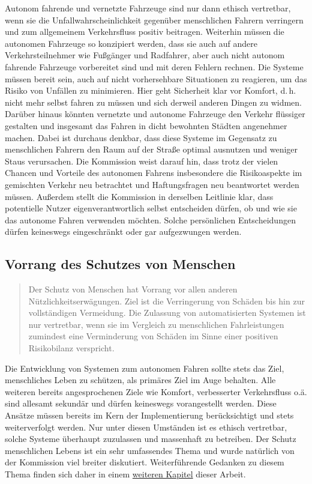 \documentclass[twoside,a4paper,12pt]{article}
\begin{document}
Autonom fahrende und vernetzte Fahrzeuge sind nur dann ethisch vertretbar,
wenn sie die Unfallwahrscheinlichkeit gegenüber menschlichen Fahrern verringern und zum allgemeinem Verkehrsfluss positiv beitragen.
Weiterhin müssen die autonomen Fahrzeuge so konzipiert werden, dass sie auch auf andere Verkehrsteilnehmer wie Fußgänger und 
Radfahrer, aber auch nicht autonom fahrende Fahrzeuge vorbereitet sind und mit deren Fehlern rechnen. Die Systeme müssen bereit 
sein, auch auf nicht vorhersehbare Situationen zu reagieren, um das Risiko von Unfällen zu minimieren. Hier 
geht Sicherheit klar vor Komfort, d.\,h. nicht mehr selbst fahren zu müssen und sich derweil anderen Dingen zu widmen.
Darüber hinaus könnten
vernetzte und autonome Fahrzeuge den Verkehr flüssiger gestalten und insgesamt das Fahren in dicht bewohnten Städten angenehmer machen. 
Dabei ist durchaus denkbar, dass diese Systeme im Gegensatz zu menschlichen Fahrern den Raum auf der Straße optimal ausnutzen und weniger Staus verursachen.
Die Kommission weist darauf hin, dass trotz der vielen Chancen und Vorteile des autonomen Fahrens insbesondere die Risikoaspekte im gemischten Verkehr neu 
betrachtet und Haftungsfragen neu beantwortet werden müssen. Außerdem stellt die Kommission in derselben Leitlinie klar, dass potentielle Nutzer eigenverantwortlich selbst entscheiden dürfen, ob und wie sie das autonome Fahren verwenden möchten. Solche persönlichen Entscheidungen dürfen keineswegs eingeschränkt oder gar
aufgezwungen werden.\\

\subsection{Vorrang des Schutzes von Menschen} \label{VorrangDesSchutzesVonMenschen}

\begin{quote}
\glqq
Der Schutz von Menschen hat Vorrang vor allen anderen Nützlichkeitserwägungen. Ziel
ist die Verringerung von Schäden bis hin zur vollständigen Vermeidung. Die Zulassung
von automatisierten Systemen ist nur vertretbar, wenn sie im Vergleich zu menschlichen
Fahrleistungen zumindest eine Verminderung von Schäden im Sinne einer positiven Risikobilanz verspricht.\grqq\mbox{~\cite[S. 10]{ek}}
\end{quote}

Die Entwicklung von Systemen zum autonomen Fahren sollte stets das Ziel, menschliches Leben zu schützen, 
als primäres Ziel im Auge behalten. Alle weiteren bereits angesprochenen Ziele wie Komfort, verbesserter Verkehrsfluss o.ä. sind allesamt sekundär 
und dürfen keineswegs vorangestellt werden. Diese Ansätze müssen bereits im Kern der Implementierung berücksichtigt und stets weiterverfolgt werden. Nur unter 
diesen Umständen ist es ethisch vertretbar, solche Systeme überhaupt zuzulassen und massenhaft zu betreiben. Der Schutz menschlichen Lebens ist ein sehr umfassendes Thema und wurde natürlich von der Kommission viel breiter diskutiert. Weiterführende Gedanken zu diesem Thema finden sich daher in einem \hyperlink{target1}{weiteren Kapitel} dieser Arbeit.\\
\end{document}
